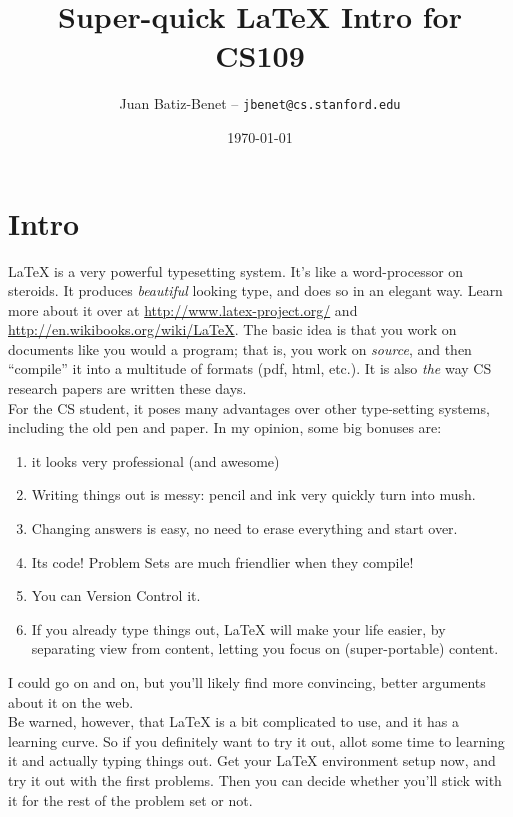 \documentclass[12pt]{article}
\title{Super-quick \LaTeX\; Intro for CS109}
\author{Juan Batiz-Benet -- \texttt{jbenet@cs.stanford.edu}}
\date{\today} %
\begin{document}
  \maketitle

  \section{Intro}
  \LaTeX \; is a very powerful typesetting system. It's like a word-processor on
  steroids. It produces \emph{beautiful} looking type, and does so in an elegant
  way. Learn more about it over at \url{http://www.latex-project.org/} and
  \url{http://en.wikibooks.org/wiki/LaTeX}. The basic idea is that you work
  on documents like you would a program; that is, you work on \emph{source}, and
  then ``compile'' it into a multitude of formats (pdf, html, etc.). It is also
  \emph{the} way CS research papers are written these days. \\

  For the CS student, it poses many advantages over other type-setting systems,
  including the old pen and paper. In my opinion, some big bonuses are:
  \begin{enumerate}
    \item it looks very professional (and awesome)
    \item Writing things out is messy: pencil and ink very quickly turn into
          mush.
    \item Changing answers is easy, no need to erase everything and start over.
    \item Its code! Problem Sets are much friendlier when they compile!
    \item You can Version Control it.
    \item If you already type things out, \LaTeX \; will make your life easier,
          by separating view from content, letting you focus on (super-portable)
          content.
  \end{enumerate}

  I could go on and on, but you'll likely find more convincing, better arguments
  about it on the web. \\

  Be warned, however, that \LaTeX \; is a bit complicated
  to use, and it has a learning curve. So if you definitely want to try it out,
  allot some time to learning it and actually typing things out. Get your \LaTeX
  environment setup now, and try it out with the first problems. Then you can
  decide whether you'll stick with it for the rest of the problem set or not. \\
\end{document}
